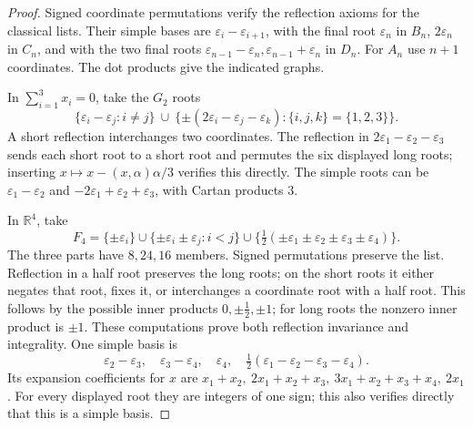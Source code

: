 \begin{proof}
Signed coordinate permutations verify the reflection axioms
for the classical lists. Their simple bases are
\(\varepsilon_i-\varepsilon_{i+1}\), with the final root
\(\varepsilon_n\) in \(B_n\), \(2\varepsilon_n\) in \(C_n\),
and with the two final roots
\(\varepsilon_{n-1}-\varepsilon_n,\varepsilon_{n-1}+\varepsilon_n\)
in \(D_n\). For \(A_n\) use \(n+1\) coordinates.
The dot products give the indicated graphs.

In \(\sum_{i=1}^3x_i=0\), take the \(G_2\) roots
\[
 \{\varepsilon_i-\varepsilon_j:i\ne j\}
 \ \cup\
 \{\pm(2\varepsilon_i-\varepsilon_j-\varepsilon_k):
                       \{i,j,k\}=\{1,2,3\}\}.
\]
A short reflection interchanges two coordinates.
The reflection in \(2\varepsilon_1-\varepsilon_2-\varepsilon_3\)
sends each short root to a short root and permutes the six
displayed long roots; inserting
\(x\mapsto x-(x,\alpha)\alpha/3\) verifies this directly.
The simple roots can be
\(\varepsilon_1-\varepsilon_2\) and
\(-2\varepsilon_1+\varepsilon_2+\varepsilon_3\),
with Cartan products \(3\).

In \(\mathbb R^4\), take
\[
 F_4=\{\pm\varepsilon_i\}\cup
 \{\pm\varepsilon_i\pm\varepsilon_j:i<j\}\cup
 \{\tfrac12(\pm\varepsilon_1\pm\varepsilon_2
                    \pm\varepsilon_3\pm\varepsilon_4)\}.
\]
The three parts have \(8,24,16\) members.
Signed permutations preserve the list. Reflection in a
half root preserves the long roots; on the short roots it
either negates that root, fixes it, or interchanges a
coordinate root with a half root. This follows by the
possible inner products \(0,\pm\tfrac12,\pm1\);
for long roots the nonzero inner product is \(\pm1\).
These computations prove both reflection invariance and
integrality. One simple basis is
\[
 \varepsilon_2-\varepsilon_3,\quad
 \varepsilon_3-\varepsilon_4,\quad
 \varepsilon_4,\quad
 \tfrac12(\varepsilon_1-\varepsilon_2-\varepsilon_3-\varepsilon_4).
\]
Its expansion coefficients for \(x\) are
\(x_1+x_2,\ 2x_1+x_2+x_3,\
3x_1+x_2+x_3+x_4,\ 2x_1\).
For every displayed root they are integers of one sign;
this also verifies directly that this is a simple basis.


\end{proof}
